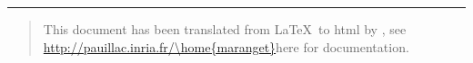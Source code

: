 \hrule
\begin{quote}
This document has been translated from \LaTeX\ to html by \htmlgen, see
\url{http://pauillac.inria.fr/\home{maranget}}{here} for documentation.
\end{quote}